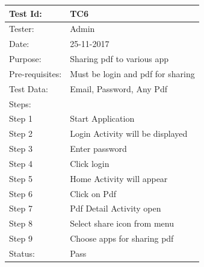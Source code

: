  \begin{center}
\begin{tabular}{ | m{5em} | m{5cm}|} 
\hline
Test Id: & TC6   \\ 
\hline
Tester: & Admin  \\ 
\hline
Date: & 25-11-2017  \\ 
\hline
Purpose: & Sharing pdf to various app   \\ 
\hline
Pre-requisites: & Must be login and pdf for sharing   \\ 
\hline
Test Data: & Email, Password, Any Pdf   \\ 
\hline
Steps: &  \\
\hline  
Step 1 &  Start Application \\ 
Step 2 &  Login Activity will be displayed  \\ 
Step 3 &  Enter password  \\ 
Step 4 &  Click login  \\ 
Step 5 &  Home Activity will appear  \\ 
Step 6 &  Click on Pdf  \\
Step 7 &  Pdf Detail Activity open \\
Step 8 &  Select share icon from menu \\
Step 9 &  Choose apps for sharing pdf \\
\hline
Status: & Pass   \\ 
\hline
\end{tabular}
\end{center}
 
 
 
 
